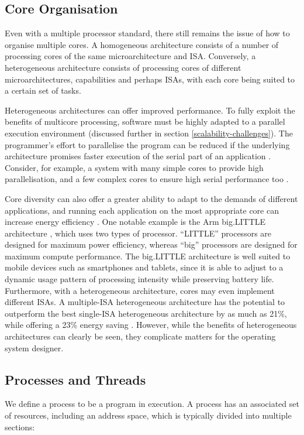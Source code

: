 \documentclass[bsc,frontabs,singlespacing,parskip,deptreport]{infthesis}
\begin{document}
\subsection{Core Organisation}
Even with a multiple processor standard, there still remains the issue of how to organise multiple cores. A homogeneous architecture consists of a number of processing cores of the same microarchitecture and ISA. Conversely, a heterogeneous architecture consists of processing cores of different microarchitectures, capabilities and perhaps ISAs, with each core being suited to a certain set of tasks.

Heterogeneous architectures can offer improved performance. To fully exploit the benefits of multicore processing, software must be highly adapted to a parallel execution environment (discussed further in section \ref{scalability-challenges}). The programmer's effort to parallelise the program can be reduced if the underlying architecture promises faster execution of the serial part of an application \cite{suleman_2007}. Consider, for example, a system with many simple cores to provide high parallelisation, and a few complex cores to ensure high serial performance too \cite{balakrishnan_2005}. 

Core diversity can also offer a greater ability to adapt to the demands of different applications, and running each application on the most appropriate core can increase energy efficiency \cite{kumar_2003}. One notable example is the Arm big.LITTLE architecture \cite{big.little}, which uses two types of processor. “LITTLE” processors are designed for maximum power efficiency, whereas “big” processors are designed for maximum compute performance. The big.LITTLE architecture is well suited to mobile devices such as smartphones and tablets, since it is able to adjust to a dynamic usage pattern of processing intensity while preserving battery life. Furthermore, with a heterogeneous architecture, cores may even implement different ISAs. A multiple-ISA heterogeneous architecture has the potential to outperform the best single-ISA heterogeneous architecture by as much as 21\%, while offering a 23\% energy saving \cite{venkat_2014}. However, while the benefits of heterogeneous architectures can clearly be seen, they complicate matters for the operating system designer.

\subsection{Processes and Threads} 
\label{processes-threads}
We define a process to be a program in execution. A process has an associated set of resources, including an address space, which is typically divided into multiple sections:
\end{document}
